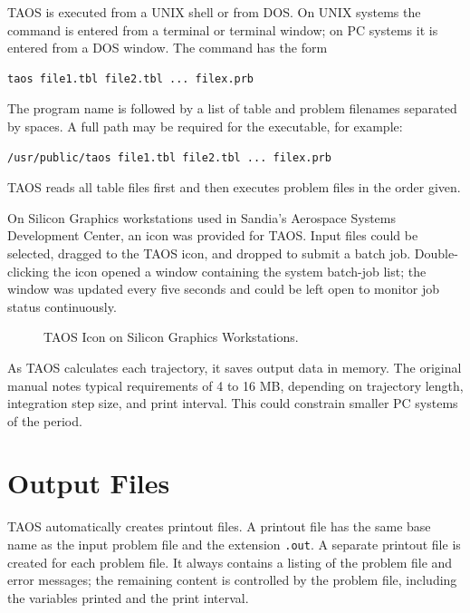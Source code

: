 TAOS is executed from a UNIX shell or from DOS. On UNIX systems the command is
entered from a terminal or terminal window; on PC systems it is entered from a DOS
window. The command has the form
\begin{lstlisting}[language={},backgroundcolor=\color{white},frame=single]
taos file1.tbl file2.tbl ... filex.prb
\end{lstlisting}
The program name is followed by a list of table and problem filenames separated by
spaces. A full path may be required for the executable, for example:
\begin{lstlisting}[language={},backgroundcolor=\color{white},frame=single]
/usr/public/taos file1.tbl file2.tbl ... filex.prb
\end{lstlisting}
TAOS reads all table files first and then executes problem files in the order given.

On Silicon Graphics workstations used in Sandia's Aerospace Systems Development
Center, an icon was provided for TAOS. Input files could be selected, dragged to the
TAOS icon, and dropped to submit a batch job. Double-clicking the icon opened a
window containing the system batch-job list; the window was updated every five
seconds and could be left open to monitor job status continuously.

\begin{figure}[htbp]
  \centering
  \resizebox{0.72\linewidth}{!}{}
  \caption{TAOS Icon on Silicon Graphics Workstations.}
  \label{fig:taos-icon}
\end{figure}

As TAOS calculates each trajectory, it saves output data in memory. The original
manual notes typical requirements of 4 to 16 MB, depending on trajectory length,
integration step size, and print interval. This could constrain smaller PC systems of
the period.

\section{Output Files}\label{sec:output-files}

TAOS automatically creates printout files. A printout file has the same base name as
the input problem file and the extension \texttt{.out}. A separate printout file is
created for each problem file. It always contains a listing of the problem file and
error messages; the remaining content is controlled by the problem file, including
the variables printed and the print interval.

